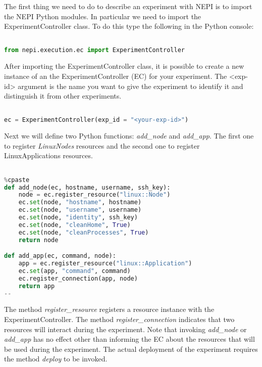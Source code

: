 The first thing we need to do to describe an experiment with NEPI 
is to import the NEPI Python modules. 
In particular we need to import the ExperimentController class. 
To do this type the following in the Python console: 

\begin{lstlisting}[language=Python]

from nepi.execution.ec import ExperimentController

\end{lstlisting}

After importing the ExperimentController class, it is possible to 
create a new instance of an the ExperimentController (EC) for 
your experiment. 
The <exp-id> argument is the name you want to give the experiment 
to identify it and distinguish it from other experiments. 

\begin{lstlisting}[language=Python]

ec = ExperimentController(exp_id = "<your-exp-id>")

\end{lstlisting}

Next we will define two Python functions: \emph{add\_node} and \emph{add\_app}.
The first one to register \textit{LinuxNodes} resources and the second one to 
register LinuxApplications resources. 

\begin{lstlisting}[language=Python]

%cpaste
def add_node(ec, hostname, username, ssh_key):
    node = ec.register_resource("linux::Node")
    ec.set(node, "hostname", hostname)
    ec.set(node, "username", username)
    ec.set(node, "identity", ssh_key)
    ec.set(node, "cleanHome", True)
    ec.set(node, "cleanProcesses", True)
    return node

def add_app(ec, command, node):
    app = ec.register_resource("linux::Application")
    ec.set(app, "command", command)
    ec.register_connection(app, node)
    return app
--

\end{lstlisting}

The method \textit{register\_resource} registers a resource instance with the 
ExperimentController. The method \textit{register\_connection} indicates
that two resources will interact during the experiment. 
Note that invoking \textit{add\_node} or \textit{add\_app} has no effect other
than informing the EC about the resources that will be used during the experiment.
The actual deployment of the experiment requires the method \textit{deploy} to
be invoked.

